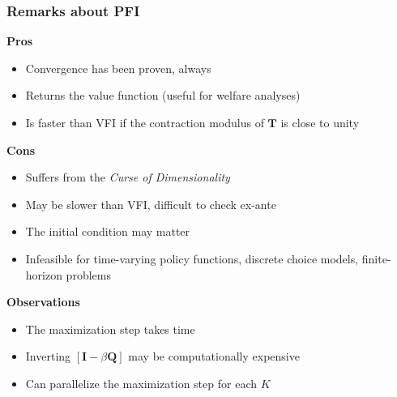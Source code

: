 \documentclass[10pt, aspectratio=1610, handout]{beamer}
\begin{document}
  \begin{frame}
    \frametitle{Remarks about PFI}

    \textbf{Pros}
    \begin{itemize}
      \item Convergence has been proven, always
      \item Returns the value function (useful for welfare analyses)
      \item Is faster than VFI if the contraction modulus of $\mathbf{T}$ is close to unity
    \end{itemize}

    \vfill\pause

    \textbf{Cons}
    \begin{itemize}
      \item Suffers from the \textit{Curse of Dimensionality}
      \item May be slower than VFI, difficult to check ex-ante
      \item The initial condition may matter
      \item Infeasible for time-varying policy functions, discrete choice models, finite-horizon problems
    \end{itemize}

    \vfill\pause

    \textbf{Observations}
    \begin{itemize}
      \item The maximization step takes time
      \item Inverting $[ \mathbf{I} - \beta \mathbf{Q} ]$ may be computationally expensive
      \item Can parallelize the maximization step for each $K$
    \end{itemize}

  \end{frame}
\end{document}

